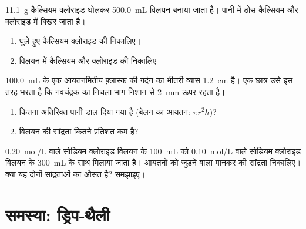 \begin{exercise}[$\star\star\star$]\label{exo:g10:concentration-and-dilution:13}
\qty{11.1}{g} कैल्सियम क्लोराइड  घोलकर
\qty{500.0}{mL} विलयन बनाया जाता है। पानी में ठोस कैल्सियम 
 और क्लोराइड   में बिखर जाता है।
\begin{enumerate}
  \item घुले हुए कैल्सियम क्लोराइड की  निकालिए।
  \item विलयन में कैल्सियम  और क्लोराइड  की  निकालिए।
\end{enumerate}
\end{exercise}

\begin{exercise}[$\star\star\star$]\label{exo:g10:concentration-and-dilution:14}
\qty{100.0}{mL} के एक आयतनमितीय फ़्लास्क की गर्दन का भीतरी व्यास
\qty{1.2}{cm} है। एक छात्र उसे इस तरह भरता है कि नवचंद्रक का निचला भाग निशान से
\qty{2}{mm} ऊपर रहता है।
\begin{enumerate}
  \item कितना अतिरिक्त पानी डाल दिया गया है (बेलन का आयतन:
        $\pi r^2 h$)?
  \item विलयन की सांद्रता कितने प्रतिशत कम है?
\end{enumerate}
\end{exercise}

\begin{exercise}[$\star\star\star$]\label{exo:g10:concentration-and-dilution:15}
\qty{0.20}{mol/L} वाले सोडियम क्लोराइड विलयन के \qty{100}{mL} को
\qty{0.10}{mol/L} वाले सोडियम क्लोराइड विलयन के \qty{300}{mL} के साथ मिलाया जाता है।
आयतनों को जुड़ने वाला मानकर  की सांद्रता निकालिए। क्या यह दोनों सांद्रताओं का
औसत है? समझाइए।
\end{exercise}

\section{समस्या: ड्रिप-थैली}

